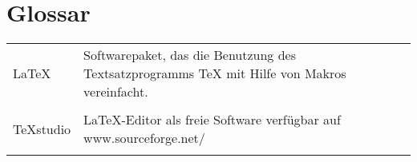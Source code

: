 %
%
%
\chapter{Glossar}
\label{cha:glossar}


\begin{tabular}{p{3cm} p{12cm}}

LaTeX & Softwarepaket, das die Benutzung des Textsatzprogramms TeX mit Hilfe von Makros vereinfacht.\\
\\
TeXstudio & LaTeX-Editor als freie Software verfügbar auf www.sourceforge.net/ \\
\\
\end{tabular}
